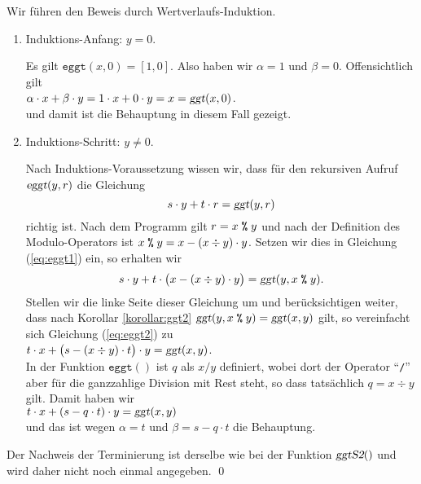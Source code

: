 \proof
Wir f\"{u}hren den Beweis durch Wertverlaufs-Induktion.
\begin{enumerate}
\item Induktions-Anfang: $y = 0$.

      Es gilt $\mathtt{eggt}(x, 0) = [ 1, 0 ]$.  Also haben wir $\alpha = 1$ und $\beta = 0$. 
      Offensichtlich gilt 
      \\[0.2cm]
      \hspace*{1.3cm}
      $\alpha \cdot x + \beta \cdot y = 1 \cdot x + 0 \cdot y = x = \textsl{ggt}(x, 0)$.
      \\[0.2cm]
      und damit ist die Behauptung in diesem Fall gezeigt. 
\item Induktions-Schritt: $y \not= 0$.

      Nach Induktions-Voraussetzung wissen wir, dass f\"{u}r den rekursiven Aufruf $\textsl{eggt}(y, r)$
      die Gleichung
      \begin{equation}
        \label{eq:eggt1}
        s \cdot y + t \cdot r = \textsl{ggt}(y, r)
      \end{equation}
      richtig ist.  Nach dem Programm gilt $r = x \;\texttt{\%}\; y$ und nach der Definition
      des Modulo-Operators ist $x \;\texttt{\%}\; y = x - (x \div y) \cdot y$.
      Setzen wir dies in Gleichung (\ref{eq:eggt1}) ein, so erhalten wir
      \begin{equation}
        \label{eq:eggt2}
        s \cdot y + t \cdot \bigl(x - (x \div y) \cdot y\bigr) = \textsl{ggt}(y, x \;\texttt{\%}\; y).        
      \end{equation}
      Stellen wir die linke Seite dieser Gleichung um und ber\"{u}cksichtigen weiter, dass nach 
      Korollar \ref{korollar:ggt2} $\textsl{ggt}(y, x \;\texttt{\%}\; y) = \textsl{ggt}(x, y)$ gilt,
      so vereinfacht sich Gleichung (\ref{eq:eggt2}) zu
      \\[0.2cm]
      \hspace*{1.3cm}
      $t \cdot x + \bigl(s - (x \div y)\cdot t\bigr) \cdot y = \textsl{ggt}(x, y)$.        
      \\[0.2cm]
      In der Funktion $\mathtt{eggt}()$ ist $q$ als $x / y$ definiert, wobei dort der Operator
      ``\texttt{/}''  aber
      f\"{u}r die ganzzahlige Division mit Rest steht, so dass tats\"{a}chlich $q = x \div y$ gilt.  Damit
      haben wir 
      \\[0.2cm]
      \hspace*{1.3cm}
      $t \cdot x + (s - q \cdot t) \cdot y = \textsl{ggt}(x, y)$
      \\[0.2cm]
      und das ist wegen $\alpha = t$ und $\beta = s - q \cdot t$ die Behauptung. 
\end{enumerate}
Der Nachweis der Terminierung ist derselbe wie bei der Funktion $\textsl{ggtS2}()$ und
wird daher nicht noch einmal angegeben. \qed


